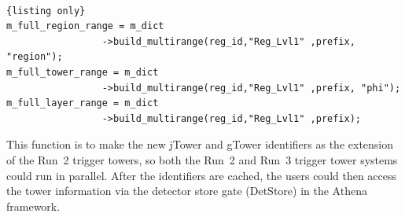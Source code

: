 \\
\begin{lstlisting}{listing only}
m_full_region_range = m_dict
                 ->build_multirange(reg_id,"Reg_Lvl1" ,prefix, "region");
m_full_tower_range = m_dict
                 ->build_multirange(reg_id,"Reg_Lvl1" ,prefix, "phi");
m_full_layer_range = m_dict
                 ->build_multirange(reg_id,"Reg_Lvl1" ,prefix);
\end{lstlisting}
\noindent
This function is to make the new jTower and gTower identifiers as the extension of the Run~2 trigger towers, so both the Run~2 and Run~3 trigger tower systems could run in parallel. After the identifiers are cached, the users could then access the tower information via the detector store gate (DetStore)\cite{Calafiura:2003gf} in the Athena framework. 

